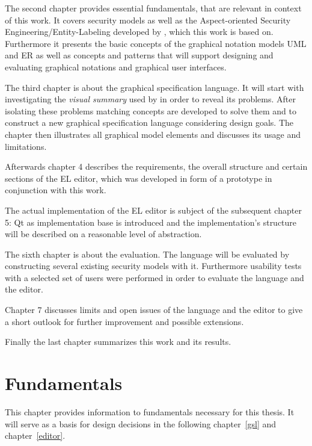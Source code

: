 \documentclass[twoside, openright, 12pt]{book}
\begin{document}
The second chapter provides essential fundamentals, that are relevant in context of this work.
It covers security models as well as the Aspect-oriented Security Engineering/Entity-Labeling developed by \cite{Amthor18}, which this work is based on.
Furthermore it presents the basic concepts of the graphical notation models UML and ER as well as concepts and patterns that will support designing and evaluating graphical notations and graphical user interfaces.

The third chapter is about the graphical specification language.
It will start with investigating the \textit{visual summary} used by \cite{Amthor18} in order to reveal its problems.
After isolating these problems matching concepts are developed to solve them and to construct a new graphical specification language considering design goals.
The chapter then illustrates all graphical model elements and discusses its usage and limitations.

Afterwards chapter 4 describes the requirements, the overall structure and certain sections of the EL editor, which was developed in form of a prototype in conjunction with this work.

The actual implementation of the EL editor is subject of the subsequent chapter 5:
Qt as implementation base is introduced and the implementation's structure will be described on a reasonable level of abstraction.

The sixth chapter is about the evaluation.
The language will be evaluated by constructing several existing security models with it.
Furthermore usability tests with a selected set of users were performed in order to evaluate the language and the editor.

Chapter 7 discusses limits and open issues of the language and the editor to give a short outlook for further improvement and possible extensions.

Finally the last chapter summarizes this work and its results.





\cleardoublepage
\chapter{Fundamentals}
\label{fundamentals}
This chapter provides information to fundamentals necessary for this thesis.
It will serve as a basis for design decisions in the following chapter~\ref{gsl} and chapter~\ref{editor}.
\end{document}
